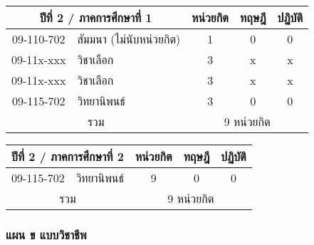 \vspace{5ex}\par\noindent
\renewcommand{\arraystretch}{1.4}
\begin{tabular}{|cp{}|ccc|}
\hline
\multicolumn{2}{|c|}{ปีที่ 2 / ภาคการศึกษาที่ 1} & \multicolumn{1}{c|}{หน่วยกิต} & \multicolumn{1}{c|}{ทฤษฎี} & \multicolumn{1}{c|}{ปฏิบัติ}  \\ \hline
\multicolumn{1}{|c|}{09-110-702}  & สัมมนา (ไม่นับหน่วยกิต) & \multicolumn{1}{c|}{1}        & \multicolumn{1}{c|}{0}     & \multicolumn{1}{c|}{0}                    \\ \hline
\multicolumn{1}{|c|}{09-11x-xxx}  & วิชาเลือก  & \multicolumn{1}{c|}{3}        & \multicolumn{1}{c|}{x}     & \multicolumn{1}{c|}{x}                    \\ \hline
\multicolumn{1}{|c|}{09-11x-xxx}  & วิชาเลือก  & \multicolumn{1}{c|}{3}        & \multicolumn{1}{c|}{x}     & \multicolumn{1}{c|}{x}                    \\ \hline
\multicolumn{1}{|c|}{09-115-702}  & วิทยานิพนธ์  & \multicolumn{1}{c|}{3}        & \multicolumn{1}{c|}{0}     & \multicolumn{1}{c|}{0}                    \\ \hline
\multicolumn{2}{|c|}{รวม}                        & \multicolumn{3}{c|}{9 หน่วยกิต}                                                                            \\ \hline
\end{tabular}

\vspace{5ex}\par\noindent
\renewcommand{\arraystretch}{1.4}
\begin{tabular}{|cp{}|ccc|}
\hline
\multicolumn{2}{|c|}{ปีที่ 2 / ภาคการศึกษาที่ 2} & \multicolumn{1}{c|}{หน่วยกิต} & \multicolumn{1}{c|}{ทฤษฎี} & \multicolumn{1}{c|}{ปฏิบัติ}  \\ \hline
\multicolumn{1}{|c|}{09-115-702}  & วิทยานิพนธ์  & \multicolumn{1}{c|}{9}        & \multicolumn{1}{c|}{0}     & \multicolumn{1}{c|}{0}                    \\ \hline
\multicolumn{2}{|c|}{รวม}                        & \multicolumn{3}{c|}{9 หน่วยกิต}                                                                            \\ \hline
\end{tabular}


\newpage
\subsubsection*{แผน ข แบบวิชาชีพ}

